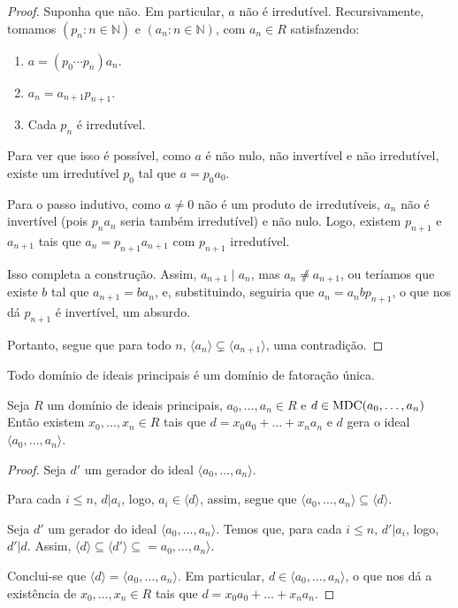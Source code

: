 \begin{proof}
    Suponha que não.
    Em particular, $a$ não é irredutível.
    Recursivamente, tomamos $(p_n: n \in \mathbb N)$ e $(a_n: n \in \mathbb N)$, com $a_n\in R$ satisfazendo:
    \begin{enumerate}[label=\alph*)]
        \item $a=(p_0\cdots p_n) a_n$.
        \item $a_{n}=a_{n+1}p_{n+1}$.
        \item Cada $p_n$ é irredutível.
    \end{enumerate}
    Para ver que isso é possível, como $a$ é não nulo, não invertível e não irredutível, existe um irredutível $p_0$ tal que $a=p_0a_0$.
    
    Para o passo indutivo, como $a\neq 0$ não é um produto de irredutíveis, $a_n$ não é invertível (pois $p_na_n$ seria também irredutível) e não nulo.
    Logo, existem $p_{n+1}$ e $a_{n+1}$ tais que $a_n=p_{n+1}a_{n+1}$ com $p_{n+1}$ irredutível.

    Isso completa a construção.
    Assim, $a_{n+1}\mid a_{n}$, mas $a_{n}\not \neq a_{n+1}$, ou teríamos que existe $b$ tal que $a_{n+1}=ba_n$, e, substituindo, seguiria que $a_n=a_nbp_{n+1}$, o que nos dá $p_{n+1}$ é invertível, um absurdo.

    Portanto, segue que para todo $n$, $\langle a_n\rangle\subsetneq \langle a_{n+1}\rangle$, uma contradição.
\end{proof}

\begin{corol}
    Todo domínio de ideais principais é um domínio de fatoração única.
\end{corol}

\begin{prop}
    Seja $R$ um domínio de ideais principais, $a_0, \dots, a_n \in R$ e $d\in \operatorname{MDC}(a_0, \dots, a_n)$
    Então existem $x_0, \dots, x_n \in R$ tais que $d=x_0a_0+\dots+x_na_n$ e $d$ gera o ideal $\langle a_0, \dots, a_n\rangle$.
\end{prop}
\begin{proof}
    Seja $d'$ um gerador do ideal $\langle a_0, \dots, a_n\rangle$.

    Para cada $i\leq n$, $d|a_i$, logo, $a_i \in \langle d\rangle$, assim, segue que $\langle a_0, \dots, a_n\rangle \subseteq \langle d\rangle$.

        Seja $d'$ um gerador do ideal $\langle a_0, \dots, a_n\rangle$. Temos que, para cada $i\leq n$, $d'|a_i$, logo, $d'|d$. Assim, $\langle d\rangle\subseteq \langle d'\rangle\subseteq = a_0, \dots, a_n\rangle$.

        Conclui-se que $\langle d\rangle = \langle a_0, \dots, a_n\rangle$. Em particular, $d \in \langle a_0, \dots, a_n\rangle$, o que nos dá a existência de $x_0, \dots, x_n \in R$ tais que $d=x_0a_0+\dots+x_na_n$.
\end{proof}
